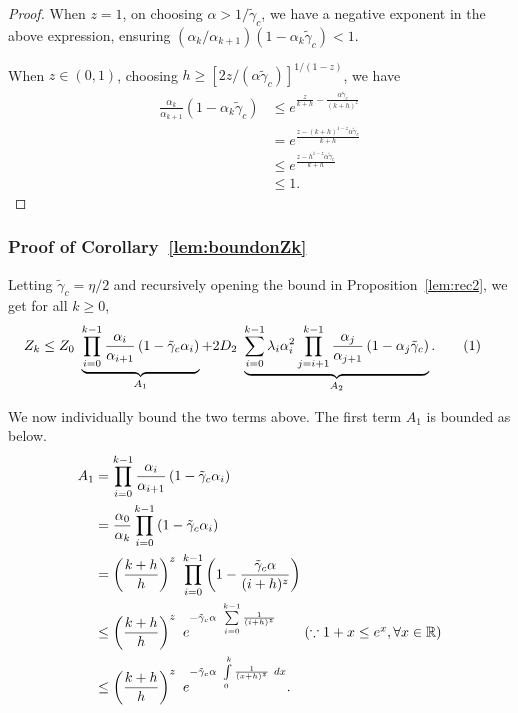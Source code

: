 \documentclass{article}
\newcommand{\numberthis}{\addtocounter{equation}{1}\tag{\theequation}}
\newcommand{\lrp}[1]{\left( #1 \right)}
\newcommand{\lrs}[1]{\left[ #1 \right]}
\newcommand{\R}{\mathbb{R}}
\begin{document}
\begin{proof}
When $z=1$, on choosing $\alpha > 1/\tilde{\gamma}_c$, we have a negative exponent in the above expression, ensuring $(\alpha_{k}/\alpha_{k+1}) (1-\alpha_k \tilde{\gamma}_c) < 1$. 

When $z \in (0,1)$, choosing $h \ge \lrs{2z/(\alpha\tilde{\gamma}_c)}^{1/(1-z)}$, we have
\begin{align*}
    \frac{\alpha_k}{\alpha_{k+1}} \lrp{1 - \alpha_k \tilde{\gamma}_c} &\le e^{ \frac{z}{k+h} - \frac{ \alpha \tilde{\gamma}_c}{(k+h)^z}} \\
    &= e^{ \frac{z - (k+h)^{1-z}\alpha \tilde{\gamma}_c}{k+h}} \\
    &\le e^{ \frac{z - h^{1-z}\alpha \tilde{\gamma}_c}{k+h}}\\
    &\le 1.
\end{align*}
\end{proof}


\subsubsection{Proof of Corollary~\ref{lem:boundonZk}}\label{app:proof_lem:boundonZk}
Letting $\tilde{\gamma}_c = \eta/2$ and recursively opening the bound in Proposition~\ref{lem:rec2}, we get for all $k\ge 0$, 
\begin{align*}
    Z_k &\le Z_0 ~ \underbrace{ \prod\limits_{i=0}^{k-1} \frac{\alpha_i}{\alpha_{i+1}} \lrp{1 - \tilde{\gamma}_c \alpha_i}}_{A_1}  + 2 D_2 ~ \underbrace{ \sum\limits_{i=0}^{k-1} \lambda_i \alpha^2_i \prod\limits_{j=i+1}^{k-1} \frac{\alpha_j}{\alpha_{j+1}}\lrp{1 - \alpha_j \tilde{\gamma}_c}}_{A_2}. \numberthis\label{eq:recZkopen}
\end{align*}

We now individually bound the two terms above. The first term $A_1$ is bounded as below. 
\begin{align*}
    A_1 
    &= \prod\limits_{i=0}^{k-1} \frac{\alpha_i}{\alpha_{i+1}} \lrp{1 - \tilde{\gamma}_c \alpha_i}\\
    &=  \frac{\alpha_0}{\alpha_{k}} \prod\limits_{i=0}^{k-1} \lrp{1-\tilde{\gamma}_c\alpha_i}\\
    &= \lrp{ \frac{k+h}{h} }^z ~ \prod\limits_{i=0}^{k-1} \lrp{1-\frac{\tilde{\gamma}_c\alpha}{(i+h)^z} }\\
    &\le  \lrp{ \frac{k+h}{h} }^z ~ e^{-\tilde{\gamma}_c\alpha~\sum\limits_{i=0}^{k-1}\frac{1}{(i+h)^z} } \tag{$\because 1+x \le e^x, \forall x\in \R$}\\
    &\le \lrp{ \frac{k+h}{h} }^z ~ e^{-\tilde{\gamma}_c\alpha~\int\limits_{0}^{k}\frac{1}{(x+h)^z} ~dx }.
\end{align*}
\end{document}

